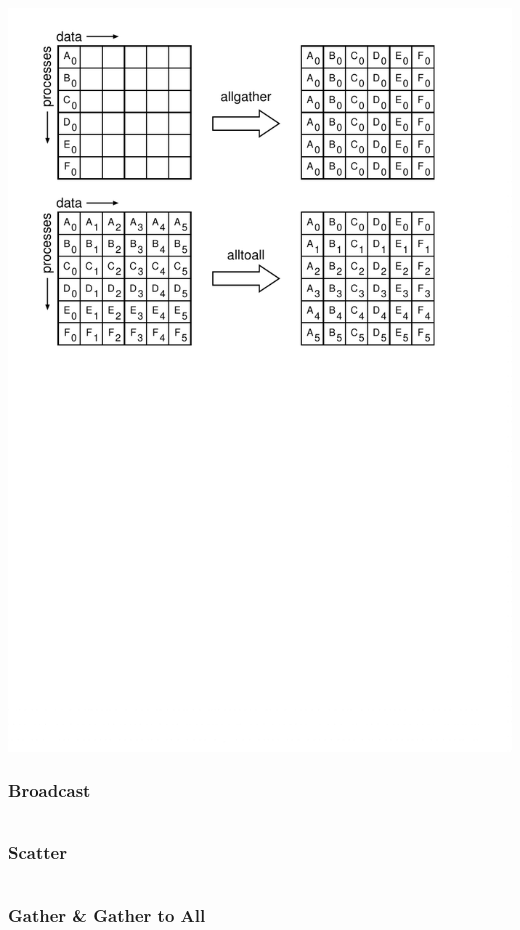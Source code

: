 \documentclass{beamer}
\begin{document}
\begin{frame}
  \includegraphics[scale=0.75]{collectives2.pdf}
\end{frame}

\begin{frame}
  \frametitle{Broadcast}
  \inputminted[linenos]{python}{coll_bcast.py}
\end{frame}

\begin{frame}
  \frametitle{Scatter}
  \inputminted[linenos]{python}{coll_scatter.py}
\end{frame}

\begin{frame}
  \frametitle{Gather \& Gather to All}
  \inputminted[linenos]{python}{coll_gather.py}
\end{frame}
\end{document}
